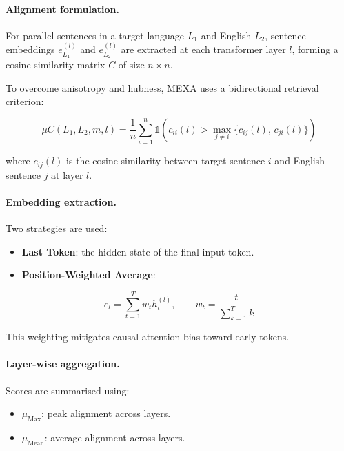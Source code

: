 \documentclass{article}
\begin{document}
\paragraph{Alignment formulation.}

For parallel sentences in a target language $L_1$ and English $L_2$,
sentence embeddings $e_{L_1}^{(l)}$ and $e_{L_2}^{(l)}$ are extracted at
each transformer layer $l$, forming a cosine similarity matrix $C$ of size
$n \times n$.

To overcome anisotropy and hubness, MEXA uses a bidirectional retrieval
criterion:

\begin{equation}
\mu C(L_1, L_2, m, l)
=
\frac{1}{n}
\sum_{i=1}^{n}
\mathbb{1}
\left(
c_{ii}(l)
>
\max_{j \neq i}
\{ c_{ij}(l),\, c_{ji}(l) \}
\right)
\end{equation}

where $c_{ij}(l)$ is the cosine similarity between target sentence $i$
and English sentence $j$ at layer $l$.

\paragraph{Embedding extraction.}

Two strategies are used:

\begin{itemize}
    \item \textbf{Last Token}: the hidden state of the final input token.
    
    \item \textbf{Position-Weighted Average}:
\end{itemize}

\begin{equation}
e_l
=
\sum_{t=1}^{T}
w_t h_t^{(l)},
\qquad
w_t
=
\frac{t}{\sum_{k=1}^{T} k}
\end{equation}

This weighting mitigates causal attention bias toward early tokens.

\paragraph{Layer-wise aggregation.}

Scores are summarised using:

\begin{itemize}
    \item $\mu_{\text{Max}}$: peak alignment across layers.
    \item $\mu_{\text{Mean}}$: average alignment across layers.
\end{itemize}
\end{document}
